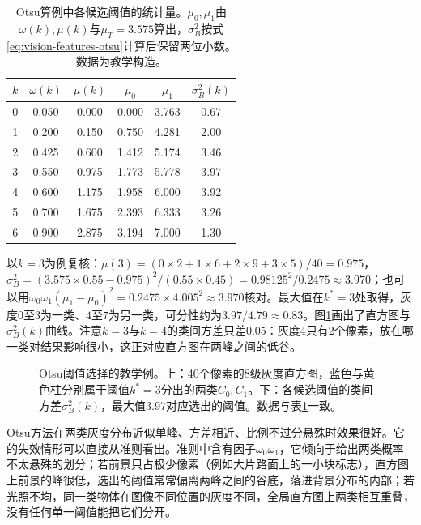 \begin{table}[htbp]
  \centering
  \small
  \begin{tabular}{@{}cccccc@{}}
    \toprule
    $k$ & $\omega(k)$ & $\mu(k)$ & $\mu_0$ & $\mu_1$ & $\sigma_B^2(k)$ \\
    \midrule
    0 & 0.050 & 0.000 & 0.000 & 3.763 & 0.67 \\
    1 & 0.200 & 0.150 & 0.750 & 4.281 & 2.00 \\
    2 & 0.425 & 0.600 & 1.412 & 5.174 & 3.46 \\
    3 & 0.550 & 0.975 & 1.773 & 5.778 & 3.97 \\
    4 & 0.600 & 1.175 & 1.958 & 6.000 & 3.92 \\
    5 & 0.700 & 1.675 & 2.393 & 6.333 & 3.26 \\
    6 & 0.900 & 2.875 & 3.194 & 7.000 & 1.30 \\
    \bottomrule
  \end{tabular}
  \caption{Otsu算例中各候选阈值的统计量。$\mu_0,\mu_1$由$\omega(k),\mu(k)$与$\mu_T=3.575$算出，$\sigma_B^2$按式\eqref{eq:vision-features-otsu}计算后保留两位小数。数据为教学构造。}
  \label{tab:vision-features-otsu-example}
\end{table}

以$k=3$为例复核：$\mu(3)=(0\times2+1\times6+2\times9+3\times5)/40=0.975$，$\sigma_B^2=(3.575\times0.55-0.975)^2/(0.55\times0.45)=0.98125^2/0.2475\approx3.970$；也可以用$\omega_0\omega_1(\mu_1-\mu_0)^2=0.2475\times4.005^2\approx3.970$核对。最大值在$k^*=3$处取得，灰度$0$至$3$为一类、$4$至$7$为另一类，可分性约为$3.97/4.79\approx0.83$。图\ref{fig:vision-features-otsu}画出了直方图与$\sigma_B^2(k)$曲线。注意$k=3$与$k=4$的类间方差只差$0.05$：灰度$4$只有2个像素，放在哪一类对结果影响很小，这正对应直方图在两峰之间的低谷。

\begin{figure}[htbp]
  \centering
  
  \caption{Otsu阈值选择的教学例。上：40个像素的8级灰度直方图，蓝色与黄色柱分别属于阈值$k^*=3$分出的两类$C_0,C_1$。下：各候选阈值的类间方差$\sigma_B^2(k)$，最大值$3.97$对应选出的阈值。数据与表\ref{tab:vision-features-otsu-example}一致。}
  \label{fig:vision-features-otsu}
\end{figure}

Otsu方法在两类灰度分布近似单峰、方差相近、比例不过分悬殊时效果很好。它的失效情形可以直接从准则看出。准则中含有因子$\omega_0\omega_1$，它倾向于给出两类概率不太悬殊的划分；若前景只占极少像素（例如大片路面上的一小块标志），直方图上前景的峰很低，选出的阈值常常偏离两峰之间的谷底，落进背景分布的内部；若光照不均，同一类物体在图像不同位置的灰度不同，全局直方图上两类相互重叠，没有任何单一阈值能把它们分开。

